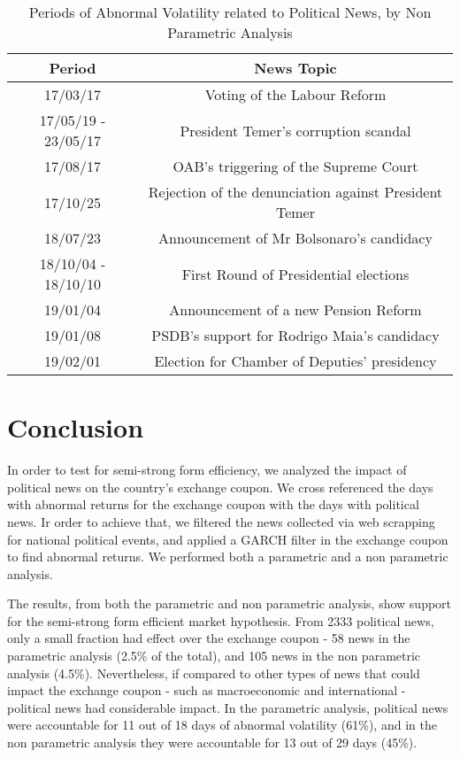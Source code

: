 \documentclass[cic,tc, english]{iiufrgs}
\begin{document}
    \begin{table}[H]
        \caption{Periods of Abnormal Volatility related to Political News, by Non Parametric Analysis}
        \label{tab:resnon}
        \centering
        \begin{tabular}{| c | c |}
            \hline
            Period & News Topic \\
            \hline \hline
            17/03/17 & Voting of the Labour Reform \\
            \hline
            17/05/19 - 23/05/17 & President Temer's corruption scandal \\
            \hline
            17/08/17 & OAB's triggering of the Supreme Court \\
            \hline
            17/10/25 & Rejection of the denunciation against President Temer \\
            \hline
            18/07/23 & Announcement of Mr Bolsonaro's candidacy \\
            \hline
            18/10/04 - 18/10/10 & First Round of Presidential elections \\
            \hline
            19/01/04 & Announcement of a new Pension Reform \\
            \hline
            19/01/08 & PSDB's support for Rodrigo Maia's candidacy \\
            \hline
            19/02/01 & Election for Chamber of Deputies' presidency \\
            \hline
        \end{tabular}
    \end{table}

\chapter{Conclusion} \label{chapter_conclusion}

    In order to test for semi-strong form efficiency, we analyzed the impact of political news on the country's exchange coupon. We cross referenced the days with abnormal returns for the exchange coupon with the days with political news. Ir order to achieve that, we filtered the news collected via web scrapping for national political events, and applied a GARCH filter in the exchange coupon to find abnormal returns. We performed both a parametric and a non parametric analysis.

    The results, from both the parametric and non parametric analysis, show support for the semi-strong form efficient market hypothesis. From 2333 political news, only a small fraction had effect over the exchange coupon - 58 news in the parametric analysis (2.5\% of the total), and 105 news in the non parametric analysis (4.5\%). Nevertheless, if compared to other types of news that could impact the exchange coupon - such as macroeconomic and international - political news had considerable impact. In the parametric analysis, political news were accountable for 11 out of 18 days of abnormal volatility (61\%), and in the non parametric analysis they were accountable for 13 out of 29 days (45\%).
\end{document}
